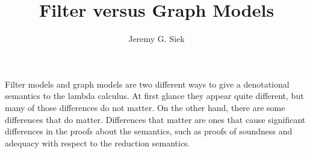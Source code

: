 \documentclass{article}
\title{Filter versus Graph Models}
\author{Jeremy G. Siek}
\begin{document}
\maketitle

Filter models and graph models are two different ways to give a
denotational semantics to the lambda calculus. At first glance they
appear quite different, but many of those differences do not matter.
On the other hand, there are some differences that do matter.
Differences that matter are ones that cause significant differences in
the proofs about the semantics, such as proofs of soundness and
adequacy with respect to the reduction semantics.












\end{document}
